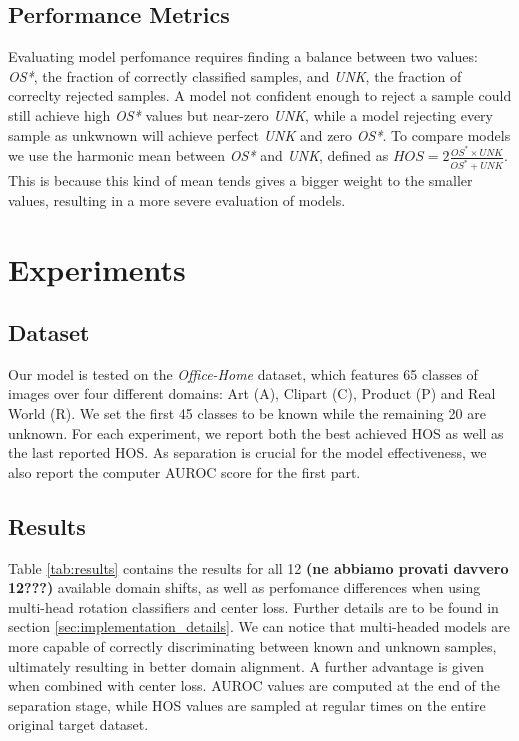 \documentclass[10pt,twocolumn,letterpaper]{article}
\begin{document}
\subsection{Performance Metrics}
\label{sec:performance_metrics}

Evaluating model perfomance requires finding a balance between two values:
{\it OS*}, 
the fraction of correctly classified samples,
and {\it UNK}, 
the fraction of correclty rejected samples.
A model not confident enough to reject a sample could still achieve high {\it OS*} values but near-zero {\it UNK},
while a model rejecting every  sample as unkwnown will achieve perfect {\it UNK} and zero {\it OS*}.
To compare models we use the harmonic mean between {\it OS*} and {\it UNK}, 
defined as $HOS = 2\frac{OS^*\times UNK}{OS^*+UNK}$.
This is because this kind of mean tends gives a bigger weight to the smaller values,
resulting in a more severe evaluation of models.

\section{Experiments}
\label{sec:experiments}

\subsection{Dataset}
\label{sec:dataset}

Our model is tested on the {\it Office-Home} dataset\cite{OfficeHomeDataset}, 
which features 65 classes of images over four different domains: Art (A), Clipart (C), Product (P) and Real World (R).
We set the first 45 classes to be known while the remaining 20 are unknown.
For each experiment, 
we report both the best achieved HOS as well as the last reported HOS.
As separation is crucial for the model effectiveness,
 we also report the computer AUROC score for the first part.

\subsection{Results}
\label{sec:results}
Table \ref{tab:results} contains the results for all 12 {\bf (ne abbiamo provati davvero 12???)} available domain shifts,
as well as perfomance differences when using multi-head rotation classifiers and center loss.
Further details are to be found in section \ref{sec:implementation_details}.
We can notice that multi-headed models are more capable of correctly discriminating between known and unknown samples,
ultimately resulting in better domain alignment.
A further advantage is given when combined with center loss.
AUROC values are computed at the end of the separation stage, 
while HOS values are sampled at regular times on the entire original target dataset.
\end{document}
